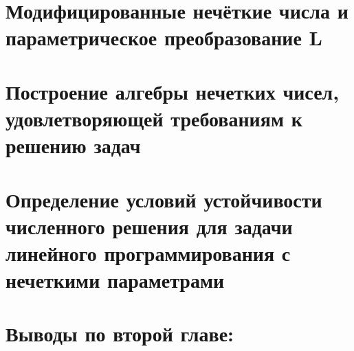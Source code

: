 \section{Модифицированные нечёткие числа и параметрическое преобразование L}
\label{chapter2_2}


\section{Построение алгебры нечетких чисел, удовлетворяющей требованиям к решению задач} 
\label{chapter2_3}


\section{Определение условий устойчивости численного решения для задачи линейного программирования с нечеткими параметрами} 
\label{chapter2_4}


\newpage
\section*{Выводы по второй главе:} 
\label{chapter2_5}
